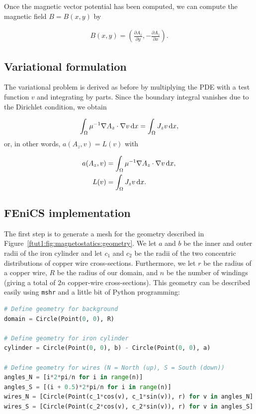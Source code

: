 \documentclass[graybox,envcountchap,sectrefs,final]{svmonodo}
\begin{document}

Once the magnetic vector potential has been computed, we can
compute the magnetic field $B = B(x, y)$ by

\begin{align}
  B(x, y) =
  \left(\frac{\partial A_z}{\partial y},
       -\frac{\partial A_z}{\partial x}\right).
\end{align}

\subsection{Variational formulation}

The variational problem is derived as before by multiplying the PDE
with a test function $v$ and integrating by parts. Since the boundary
integral vanishes due to the Dirichlet condition, we obtain

\begin{equation}
  \int_{\Omega} \mu^{-1} \nabla A_z \cdot \nabla v \, \mathrm{d}x
  = \int_{\Omega} J_z v \, \mathrm{d}x,
\end{equation}
or, in other words, $a(A_z, v) = L(v)$ with

\begin{align}
  a(A_z, v) &= \int_{\Omega} \mu^{-1} \nabla A_z \cdot \nabla v \, \mathrm{d}x, \\
  L(v) &= \int_{\Omega} J_z v \, \mathrm{d}x.
\end{align}

\subsection{FEniCS implementation}

The first step is to generate a mesh for the geometry described in
Figure~\ref{ftut1:fig:magnetostatics:geometry}. We let $a$ and $b$ be the
inner and outer radii of the iron cylinder and let $c_1$ and $c_2$
be the radii of the two concentric distributions of copper wire
cross-sections. Furthermore, we let $r$ be the radius of a copper
wire, $R$ be the radius of our domain, and $n$ be the number of
windings (giving a total of $2n$ copper-wire cross-sections). This
geometry can be described easily using \texttt{mshr} and a little bit of
Python programming:


\begin{lstlisting}[language=Python,style=graycolor]
# Define geometry for background
domain = Circle(Point(0, 0), R)

# Define geometry for iron cylinder
cylinder = Circle(Point(0, 0), b) - Circle(Point(0, 0), a)

# Define geometry for wires (N = North (up), S = South (down))
angles_N = [i*2*pi/n for i in range(n)]
angles_S = [(i + 0.5)*2*pi/n for i in range(n)]
wires_N = [Circle(Point(c_1*cos(v), c_1*sin(v)), r) for v in angles_N]
wires_S = [Circle(Point(c_2*cos(v), c_2*sin(v)), r) for v in angles_S]
\end{lstlisting}
\end{document}
